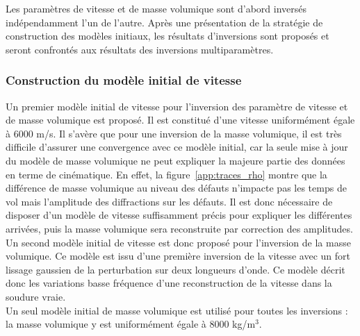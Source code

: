 Les paramètres de vitesse et de masse volumique sont d'abord inversés indépendamment l'un de l'autre. Après une présentation de la stratégie de construction des modèles initiaux, les résultats d'inversions sont proposés et seront confrontés aux résultats des inversions multiparamètres.



\subsubsection{Construction du modèle initial de vitesse}

Un premier modèle initial de vitesse pour l'inversion des paramètre de vitesse et de masse volumique est proposé. Il est constitué d'une vitesse uniformément égale à 6000 m/s. Il s'avère que pour une inversion de la masse volumique, il est très difficile d'assurer une convergence avec ce modèle initial, car la seule mise à jour du modèle de masse volumique ne peut expliquer la majeure partie des données en terme de cinématique. En effet, la figure~\ref{app:traces_rho} montre que la différence de masse volumique au niveau des défauts n'impacte pas les temps de vol mais l'amplitude des diffractions sur les défauts. Il est donc nécessaire de disposer d'un modèle de vitesse suffisamment précis pour expliquer les différentes arrivées, puis la masse volumique sera reconstruite par correction des amplitudes. \\

Un second modèle initial de vitesse est donc proposé pour l'inversion de la masse volumique. Ce modèle est issu d'une première inversion de la vitesse avec un fort lissage gaussien de la perturbation sur deux longueurs d'onde. Ce modèle décrit donc les variations basse fréquence d'une reconstruction de la vitesse dans la soudure vraie.\\

Un seul modèle initial de masse volumique est utilisé pour toutes les inversions : la masse volumique y est uniformément égale à 8000 kg/m$^{3}$.

